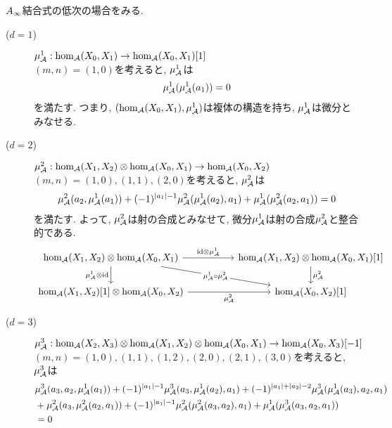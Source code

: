 \documentclass[uplatex, a4paper, 14Q, dvipdfmx]{jsarticle}
\begin{document}
\begin{remark} \label{rem_low_Ainf_associativity}
  $A_{\infty}$結合式の低次の場合をみる. 
  \begin{description}
    \item[($d=1$)] $\mu^1_{\mathcal{A}} : \hom_{\mathcal{A}}(X_0,X_1) \to \hom_{\mathcal{A}}(X_0,X_1)[1]$ \\
    $(m,n) = (1,0)$を考えると, $\mu^1_{\mathcal{A}}$は
    \begin{align*}
      \mu^1_{\mathcal{A}} (\mu^1_{\mathcal{A}} (a_1))
      = 0
    \end{align*}
    を満たす. 
    つまり, $(\hom_{\mathcal{A}}(X_0,X_1), \mu^1_{\mathcal{A}})$は複体の構造を持ち, $\mu^1_{\mathcal{A}}$は微分とみなせる. 
    \item[($d=2$)] $\mu^2_{\mathcal{A}} : \hom_{\mathcal{A}}(X_1,X_2) \otimes \hom_{\mathcal{A}}(X_0,X_1) \to \hom_{\mathcal{A}}(X_0,X_2)$ \\
    $(m,n) = (1,0), (1,1), (2,0)$を考えると, $\mu^2_{\mathcal{A}}$は 
    \begin{align*}
      \mu^2_{\mathcal{A}}(a_2, \mu^1_{\mathcal{A}}(a_1)) + (-1)^{|a_1|-1} \mu^2_{\mathcal{A}}(\mu^1_{\mathcal{A}}(a_2), a_1) + \mu^1_{\mathcal{A}}(\mu^2_{\mathcal{A}}(a_2, a_1))
      = 0
    \end{align*}
    を満たす. 
    よって, $\mu^2_{\mathcal{A}}$は射の合成とみなせて, 微分$\mu^1_{\mathcal{A}}$は射の合成$\mu^2_{\mathcal{A}}$と整合的である. 
    \[\begin{tikzcd}
      {\hom_\A(X_1,X_2) \otimes \hom_\A(X_0,X_1)} && {\hom_\A(X_1,X_2) \otimes \hom_\A(X_0,X_1)[1]} \\
      {\hom_\A(X_1,X_2)[1] \otimes \hom_\A(X_0,X_2)} && {\hom_\A(X_0,X_2)[1]}
      \arrow["{\id \otimes \mu^1_\A}", from=1-1, to=1-3]
      \arrow["{\mu^2_\A}", from=1-3, to=2-3]
      \arrow["{\mu^1_\A \otimes \id}"', from=1-1, to=2-1]
      \arrow["{\mu^2_\A}"', from=2-1, to=2-3]
      \arrow["{\mu^1_\A \circ \mu^2_\A}"{description}, from=1-1, to=2-3]
    \end{tikzcd}\]
    \item[($d=3$)] $\mu^3_{\mathcal{A}} : \hom_{\mathcal{A}}(X_2,X_3) \otimes \hom_{\mathcal{A}}(X_1,X_2) \otimes \hom_{\mathcal{A}}(X_0,X_1) \to \hom_{\mathcal{A}}(X_0,X_3)[-1]$ \\
    $(m,n) = (1,0), (1,1), (1,2), (2,0), (2,1), (3,0)$を考えると, $\mu^3_{\mathcal{A}}$は
    \begin{align*}
      &\mu^3_{\mathcal{A}}(a_3, a_2, \mu^1_{\mathcal{A}}(a_1)) + (-1)^{|a_1|-1} \mu^3_{\mathcal{A}}(a_3, \mu^1_{\mathcal{A}}(a_2), a_1) + (-1)^{|a_1|+|a_2|-2} \mu^3_{\mathcal{A}}(\mu^1_{\mathcal{A}}(a_3), a_2, a_1) \\
      &+ \mu^2_{\mathcal{A}}(a_3, \mu^2_{\mathcal{A}}(a_2,a_1)) + (-1)^{|a_1|-1} \mu^2_{\mathcal{A}}(\mu^2_{\mathcal{A}}(a_3,a_2), a_1) + \mu^1_{\mathcal{A}}(\mu^3_{\mathcal{A}}(a_3,a_2,a_1)) \\
      &= 0
    \end{align*}

\end{description}
\end{remark}
\end{document}
